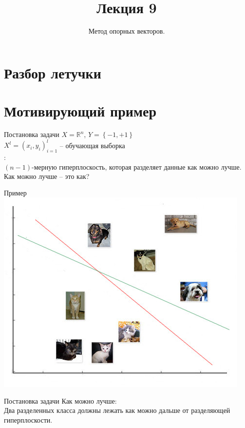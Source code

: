 \documentclass[12pt]{beamer}
\title{Лекция 9}
\subtitle{Метод опорных векторов.}
\begin{document}
	

\section{Разбор летучки}

\frame{\titlepage}

\section{Мотивирующий пример}

\begin{frame}{Постановка задачи}
	$X = \mathbb{R}^n$, ${Y = \left\{ -1, + 1\right\}}$\\
	${X^l = (x_i, y_i)_{i = 1}^l}$ -- обучающая выборка\\
	:\\
	$(n-1)$-мерную гиперплоскость, которая разделяет данные как можно лучше.
	\\ \bigbreak
	Как можно лучше -- это как?
\end{frame}

\begin{frame}{Пример}
  \centering
  \includegraphics[width=0.9 \textwidth, keepaspectratio]{images/catdog}
\end{frame}

\begin{frame}{Постановка задачи}
	Как можно лучше:\\
	Два разделенных класса должны лежать как можно дальше от разделяющей гиперплоскости.\\
\end{frame}
\end{document}
